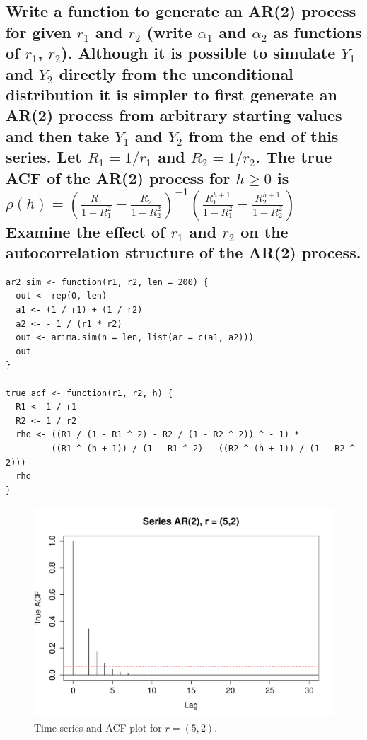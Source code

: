 \documentclass[10pt,a4paper]{article}
\let\Oldsubsection\subsection
\renewcommand{\subsection}{\FloatBarrier\Oldsubsection}
\begin{document}
\subsection{Write a function to generate an AR(2) process for given $r_1$ and $r_2$ (write $\alpha_1$ and $\alpha_2$ as functions of $r_1$, $r_2$). Although it
is possible to simulate $Y_1$ and $Y_2$ directly from the unconditional distribution it is
simpler to first generate an AR(2) process from arbitrary starting values and then
take $Y_1$ and $Y_2$ from the end of this series.
Let $R_1 = 1/r_1$ and $R_2 = 1/r_2$. The true ACF of the AR(2) process for $h \geq 0$ is \\
$\rho(h) = \left(\frac{R_1}{1-R_1^2} - \frac{R_2}{1-R_2^2}\right)^{-1}\left(\frac{R_1^{h+1}}{1-R_1^2} - \frac{R_2^{h+1}}{1-R_2^2}\right)$ \\
Examine the effect of $r_1$ and $r_2$ on the autocorrelation structure of the AR(2) process.
}

\begin{lstlisting}
ar2_sim <- function(r1, r2, len = 200) {
  out <- rep(0, len)
  a1 <- (1 / r1) + (1 / r2)
  a2 <- - 1 / (r1 * r2)
  out <- arima.sim(n = len, list(ar = c(a1, a2)))
  out
}

true_acf <- function(r1, r2, h) {
  R1 <- 1 / r1
  R2 <- 1 / r2
  rho <- ((R1 / (1 - R1 ^ 2) - R2 / (1 - R2 ^ 2)) ^ - 1) * 
         ((R1 ^ (h + 1)) / (1 - R1 ^ 2) - ((R2 ^ (h + 1)) / (1 - R2 ^ 2)))
  rho
}
\end{lstlisting}

\begin{figure}[h!]
\includegraphics[width=\linewidth]{plots/p7_5_2.pdf}
\caption{Time series and ACF plot for $r=(5, 2)$.}
\end{figure}
\end{document}
